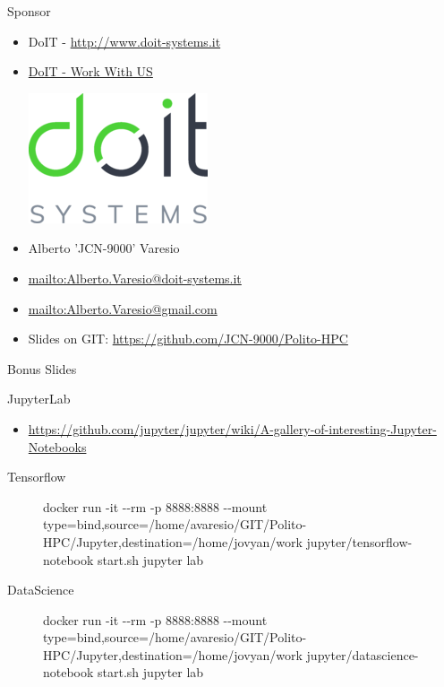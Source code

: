 \documentclass[ignorenonframetext,]{beamer}
\providecommand{\tightlist}{%
  \setlength{\itemsep}{0pt}\setlength{\parskip}{0pt}}
\begin{document}
\begin{frame}{Sponsor}

\begin{itemize}
\item
  DoIT - \href{http://www.doit-systems.it/}{http://www.doit-systems.it}
\item
  \href{http://www.doit-systems.it/EN_lavoraconnoi.html}{DoIT - Work
  With US}

  \includegraphics{images/DoIT.png}
\item
  Alberto 'JCN-9000' Varesio
\item
  \href{Alberto.Varesio@doit-systems.it}{mailto:Alberto.Varesio@doit-systems.it}
\item
  \href{Alberto.Varesio@gmail.com}{mailto:Alberto.Varesio@gmail.com}
\end{itemize}


\begin{itemize}
\tightlist
\item
  Slides on GIT: \url{https://github.com/JCN-9000/Polito-HPC}
\end{itemize}


\end{frame}

\begin{frame}{Bonus Slides}

\end{frame}

\begin{frame}{JupyterLab}

\begin{itemize}
\tightlist
\item
  \url{https://github.com/jupyter/jupyter/wiki/A-gallery-of-interesting-Jupyter-Notebooks}
\end{itemize}


\begin{description}
\item[Tensorflow]
docker run -it -\/-rm -p 8888:8888 -\/-mount
type=bind,source=/home/avaresio/GIT/Polito-HPC/Jupyter,destination=/home/jovyan/work
jupyter/tensorflow-notebook start.sh jupyter lab
\item[DataScience]
docker run -it -\/-rm -p 8888:8888 -\/-mount
type=bind,source=/home/avaresio/GIT/Polito-HPC/Jupyter,destination=/home/jovyan/work
jupyter/datascience-notebook start.sh jupyter lab
\end{description}


\end{frame}
\end{document}

